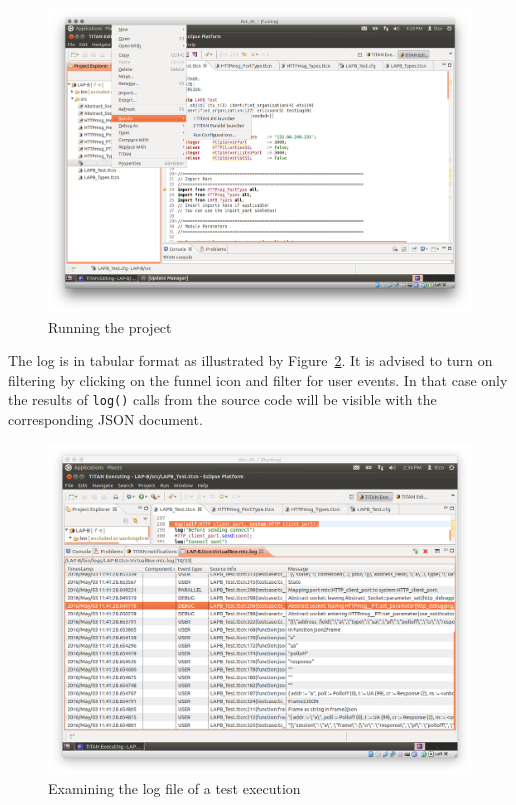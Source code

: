 \documentclass[a4paper]{article}
\begin{document}
\begin{figure}[H]
    \centering
    \includegraphics[width=\textwidth]{figures/run.png}
    \caption{Running the project}
    \label{fig:run}
\end{figure}

The log is in tabular format as illustrated by Figure~\ref{fig:log}. It is advised to turn on filtering by clicking on
the funnel icon and filter for user events. In that case only the results of \verb!log()! calls from
the source code will be visible with the corresponding JSON document.

\begin{figure}[H]
    \centering
    \includegraphics[width=\textwidth]{figures/log.png}
    \caption{Examining the log file of a test execution}
    \label{fig:log}
\end{figure}
\end{document}
